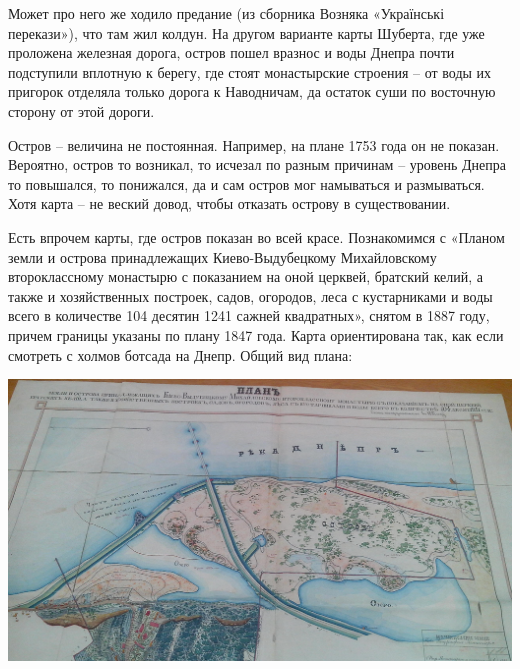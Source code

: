 Может про него же ходило предание (из сборника Возняка «Українські перекази»), что там жил колдун. На другом варианте карты Шуберта, где уже проложена железная дорога, остров пошел вразнос и воды Днепра почти подступили вплотную к берегу, где стоят монастырские строения – от воды их пригорок отделяла только дорога к Наводничам, да остаток суши по восточную сторону от этой дороги.

Остров – величина не постоянная. Например, на плане 1753 года он не показан. Вероятно, остров то возникал, то исчезал по разным причинам – уровень Днепра то повышался, то понижался, да и сам остров мог намываться и размываться. Хотя карта – не веский довод, чтобы отказать острову в существовании.

Есть впрочем карты, где остров показан во всей красе. Познакомимся с «Планом земли и острова принадлежащих Киево-Выдубецкому Михайловскому второклассному монастырю с показанием на оной церквей, братский келий, а также и хозяйственных построек, садов, огородов, леса с кустарниками и воды всего в количестве 104 десятин 1241 сажней квадратных», снятом в 1887 году, причем границы указаны по плану 1847 года. Карта ориентирована так, как если смотреть с холмов ботсада на Днепр. Общий вид плана:

\vspace*{\fill}

\begin{center}
\includegraphics[width=\linewidth]{chast-vosp/zver/IMG_20170627_153827.jpg}
\end{center}

\vspace*{\fill}

\newpage

